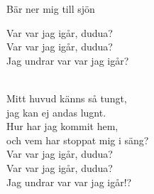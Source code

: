 \begin{song}{Bär ner mig till sjön}
    \showversenumber
	\begin{repetition}
		Var var jag igår, dudua?\\
		Var var jag igår, dudua?\\
		Jag undrar var var jag igår?
	\end{repetition}\\
	Mitt huvud känns så tungt,\\
	jag kan ej andas lugnt.\\
	Hur har jag kommit hem,\\
	och vem har stoppat mig i säng?\\
	Var var jag igår, dudua?\\
	Var var jag igår, dudua?\\
	Jag undrar var var jag igår!?
	
\end{song}
